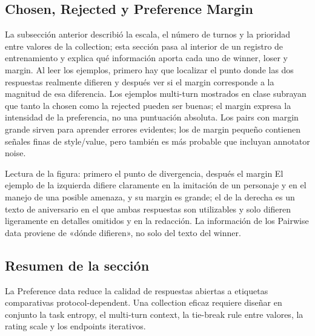 
\subsection{Chosen, Rejected y Preference Margin}

La subsección anterior describió la escala, el número de turnos y la prioridad entre valores de la collection; esta sección pasa al interior de un registro de entrenamiento y explica qué información aporta cada uno de winner, loser y margin. Al leer los ejemplos, primero hay que localizar el punto donde las dos respuestas realmente difieren y después ver si el margin corresponde a la magnitud de esa diferencia. Los ejemplos multi-turn mostrados en clase subrayan que tanto la chosen como la rejected pueden ser buenas; el margin expresa la intensidad de la preferencia, no una puntuación absoluta. Los pairs con margin grande sirven para aprender errores evidentes; los de margin pequeño contienen señales finas de style/value, pero también es más probable que incluyan annotator noise.


\begin{knowledgebox}{Lectura de la figura: primero el punto de divergencia, después el margin}
El ejemplo de la izquierda difiere claramente en la imitación de un personaje y en el manejo de una posible amenaza, y su margin es grande; el de la derecha es un texto de aniversario en el que ambas respuestas son utilizables y solo difieren ligeramente en detalles omitidos y en la redacción. La información de los Pairwise data proviene de «dónde difieren», no solo del texto del winner.
\end{knowledgebox}


\subsection{Resumen de la sección}

La Preference data reduce la calidad de respuestas abiertas a etiquetas comparativas protocol-dependent. Una collection eficaz requiere diseñar en conjunto la task entropy, el multi-turn context, la tie-break rule entre valores, la rating scale y los endpoints iterativos.
